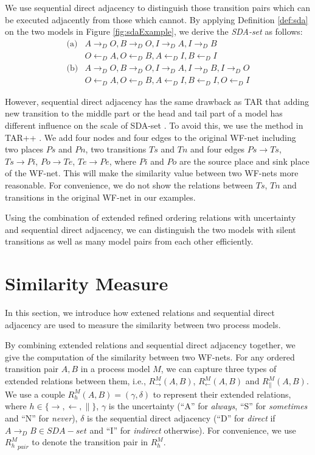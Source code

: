 \documentclass[dvips,...]{llncs}
\begin{document}
We use sequential direct adjacency to distinguish those transition pairs which can be executed adjacently from those which cannot. By applying Definition \ref{def:sda} on the two models in Figure \ref{fig:sdaExample}, we derive the \textit{SDA-set} as follows:
\begin{displaymath}
	\begin{aligned}
		\text{(a)} & A\rightarrow_{D}O, B\rightarrow_{D}O, I\rightarrow_{D}A, I\rightarrow_{D}B\\
		& O\leftarrow_{D}A, O\leftarrow_{D}B, A\leftarrow_{D}I, B\leftarrow_{D}I\\
		\text{(b)} & A\rightarrow_{D}O, B\rightarrow_{D}O, I\rightarrow_{D}A, I\rightarrow_{D}B, I\rightarrow_{D}O\\
		& O\leftarrow_{D}A, O\leftarrow_{D}B, A\leftarrow_{D}I, B\leftarrow_{D}I, O\leftarrow_{D}I
	\end{aligned}
\end{displaymath}

However, sequential direct adjacency has the same drawback as TAR that adding new transition to the middle part or the head and tail part of a model has different influence on the scale of SDA-set \cite{wang2015tar++}. To avoid this, we use the method in TAR++ \cite{wang2015tar++}. We add four nodes and four edges to the original WF-net including two places $Ps$ and $Pn$, two transitions $Ts$ and $Tn$ and four edges $Ps\rightarrow Ts$, $Ts\rightarrow Pi$, $Po\rightarrow Te$, $Te\rightarrow Pe$, where $Pi$ and $Po$ are the source place and sink place of the WF-net. This will make the similarity value between two WF-nets more reasonable. For convenience, we do not show the relations between $Ts$, $Tn$ and transitions in the original WF-net in our examples.

Using the combination of extended refined ordering relations with uncertainty and sequential direct adjacency, we can distinguish the two models with silent transitions as well as many model pairs from each other efficiently.

\section{Similarity Measure}\label{sec:similarity}
In this section, we introduce how extened relations and sequential direct adjacency are used to measure the similarity between two process models.

By combining extended relations and sequential direct adjacency together, we give the computation of the similarity between two WF-nets. For any ordered transition pair $A,B$ in a process model $M$, we can capture three types of extended relations between them, i.e., $R_{\rightarrow}^{M}(A,B)$, $R_{\leftarrow}^{M}(A,B)$ and $R_{\parallel}^{M}(A,B)$. We use a couple $R_{h}^{M}(A,B)=(\gamma,\delta)$ to represent their extended relations, where $h\in\{\rightarrow,\leftarrow,\parallel\}$, $\gamma$ is the uncertainty (``A'' for \textit{always}, ``S'' for \textit{sometimes} and ``N'' for \textit{never}), $\delta$ is the sequential direct adjacency (``D'' for \textit{direct} if $A\rightarrow_{D}B\in SDA-set$ and ``I'' for \textit{indirect} otherwise). For convenience, we use ${R_{h}^{M}}_{pair}$ to denote the transition pair in $R_{h}^{M}$.
\end{document}
